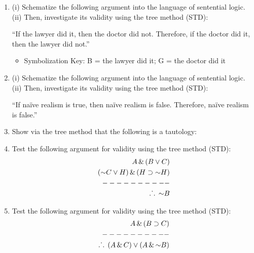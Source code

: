 \documentclass[12pt]{article}
\def\therefore{\ensuremath{\ldotp\dot{}\,\ldotp}}
\def\eor{\ensuremath{\vee}}
\def\eand{\ensuremath{\,\&\,}}
\def\eif{\ensuremath{\supset}}
\def\enot{\ensuremath{{\sim}}} %
\let\oldsim\sim %
\renewcommand{\sim}{{\oldsim}} %
\begin{document}
\begin{enumerate}

\item (i) Schematize the following argument into the language of sentential logic. \\ (ii) Then, investigate its validity using the tree method (STD): 

``If the lawyer did it, then the doctor did not. Therefore, if the doctor did it, then the lawyer did not.''

\begin{itemize}

\item Symbolization Key: B = the lawyer did it; G = the doctor did it  

\end{itemize}


\item (i) Schematize the following argument into the language of sentential logic. \\ (ii) Then, investigate its validity using the tree method (STD): 

``If na\"ive realism is true, then na\"ive realism is false. Therefore, na\"ive realism is false.''

\medskip

\item Show via the tree method that the following is a tautology: 

\makebox[\textwidth]{$\big( ( P \eor Q) \eand (P \eor R) \big) \eif \big (P \eor (Q \eand R) \big ) $}

\medskip

\item Test the following argument for validity using the tree method (STD):
\begin{align*}
 A \eand (B \eor C) \\ 
(\enot C \eor H) \eand  (H \eif \enot H)\\
- - - - - - - - - -\\
\therefore \; \enot B 
\end{align*}

\item Test the following argument for validity using the tree method (STD):
\begin{align*}
 A \eand (B \eif C) \\ 
- - - - - - - - - -\\
\therefore \; (A \eand C) \eor (A \eand \enot B)  
\end{align*}


\end{enumerate}
\end{document}
